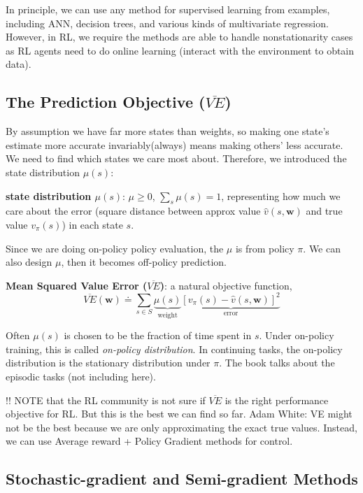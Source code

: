 \documentclass[sutton_barto_notes.tex]{subfiles}
\begin{document}
In principle, we can use any method for supervised learning from examples, including ANN, decision trees, and various kinds of multivariate regression.
However, in RL, we require the methods are able to handle nonstationarity cases as RL agents need to do online learning (interact with the environment to obtain data).

\subsection{The Prediction Objective ($\overline{VE}$)}

By assumption we have far more states than weights, so making one state's estimate more accurate invariably(always) means making others' less accurate. We need to find which states we care most about. Therefore, we introduced the state distribution $\mu(s)$:
\begin{definition}
\textbf{state distribution $\mu(s)$}: $\mu \geq 0$, $\sum_s \mu(s) = 1$, representing how much we care about the error (square distance between approx value $\hat{v}(s,\bm{w})$ and true value $v_\pi(s)$) in each state $s$.
\end{definition}

Since we are doing on-policy policy evaluation, the $\mu$ is from policy $\pi$. We can also design $\mu$, then it becomes off-policy prediction.

\begin{definition}
\textbf{Mean Squared Value Error ($\overline{VE}$)}: a natural objective function,
$$\overline{VE}(\bm{w}) \doteq \sum_{s\in S} \underbrace{\mu(s)}_{\text{weight}} \underbrace{[v_\pi(s) - \hat{v}(s,\bm{w})]^2}_{\text{error}}$$
\end{definition}

Often $\mu(s)$ is chosen to be the fraction of time spent in $s$. Under on-policy training, this is called \textit{on-policy distribution}. In continuing tasks, the on-policy distribution is the stationary distribution under $\pi$. The book talks about the episodic tasks (not including here).

!! NOTE that the RL community is not sure if $\overline{VE}$ is the right performance objective for RL. But this is the best we can find so far. Adam White: VE might not be the best because we are only approximating the exact true values. Instead, we can use Average reward + Policy Gradient methods for control.

\subsection{Stochastic-gradient and Semi-gradient Methods}
\end{document}
